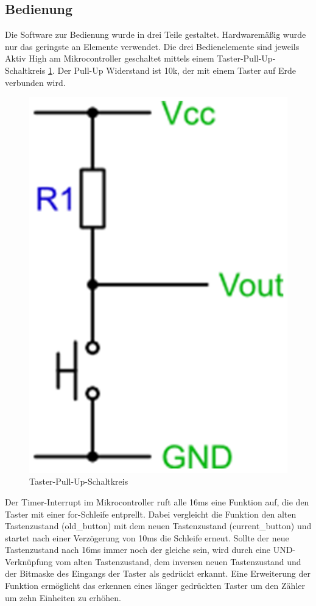 \subsection{Bedienung}
Die Software zur Bedienung wurde in drei Teile gestaltet. Hardwaremäßig wurde nur das geringste an Elemente verwendet. Die drei Bedienelemente sind jeweils Aktiv High am Mikrocontroller geschaltet mittels einem Taster-Pull-Up-Schaltkreis \ref{fig:SwitchPullUp_Software}. Der Pull-Up Widerstand ist 10k\Omega, der mit einem Taster auf Erde verbunden wird.

\begin{figure}[h]
	\centering
		\includegraphics[width=1.00\textwidth]{switchpullupcircuit.jpg}
	\caption{Taster-Pull-Up-Schaltkreis}
	\label{fig:SwitchPullUp_Software}
\end{figure}

Der Timer-Interrupt im Mikrocontroller ruft alle 16ms eine Funktion auf, die den Taster mit einer for-Schleife entprellt. Dabei vergleicht die Funktion den alten Tastenzustand (old_button) mit dem neuen Tastenzustand (current_button) und startet nach einer Verzögerung von 10ms die Schleife erneut. Sollte der neue Tastenzustand nach 16ms immer noch der gleiche sein, wird durch eine UND-Verknüpfung vom alten Tastenzustand, dem inversen neuen Tastenzustand und der Bitmaske des Eingangs der Taster als gedrückt erkannt. Eine Erweiterung der Funktion ermöglicht das erkennen eines länger gedrückten Taster um den Zähler um zehn Einheiten zu erhöhen.
\newline